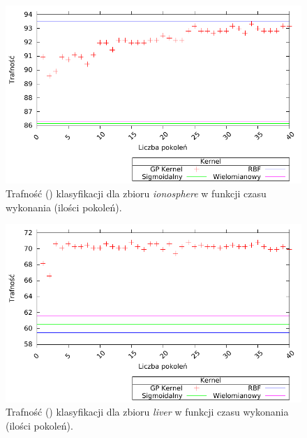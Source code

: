 	\begin{figure}
		\includegraphics[scale=0.90]{figures/results/accuracy/accuracy-ionosphere}
		\caption{Trafność () klasyfikacji dla zbioru \emph{ionosphere} w funkcji czasu wykonania (ilości pokoleń).\label{fig:acc-ionosphere}}
	\end{figure}
	
	\begin{figure}
		\includegraphics[scale=0.90]{figures/results/accuracy/accuracy-liver-disorders}
		\caption{Trafność () klasyfikacji dla zbioru \emph{liver} w funkcji czasu wykonania (ilości pokoleń).\label{fig:acc-liver}}
	\end{figure}
		
